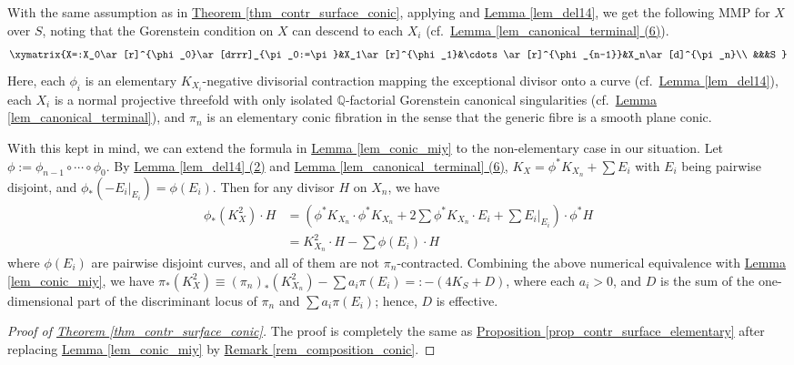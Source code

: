\begin{rmq}\label{rem_composition_conic}
With the same assumption as in {\hyperref[thm_contr_surface_conic]{Theorem    \ref*{thm_contr_surface_conic}}},  applying \cite[Proof of Proposition 3.4]{Rom19} and {\hyperref[lem_del14]{Lemma  \ref*{lem_del14}}}, we 
get the following MMP for $X$ over $S$, noting that the Gorenstein condition on $X$ can descend to each $X_i$ (cf.~{\hyperref[lem_canonical_terminal]{Lemma  \ref*{lem_canonical_terminal} (6)}}).
\[\xymatrix{X=:X_0\ar[r]^{\phi_0}\ar[drrr]_{\pi_0:=\pi}&X_1\ar[r]^{\phi_1}&\cdots\ar[r]^{\phi_{n-1}}&X_n\ar[d]^{\pi_n}\\
&&&S
}
\]
Here, each $\phi_i$ is an elementary $K_{X_i}$-negative divisorial contraction mapping the exceptional divisor  onto a curve (cf.~{\hyperref[lem_del14]{Lemma  \ref*{lem_del14}}}), each $X_i$ is a normal projective threefold with only isolated $\mathbb{Q}$-factorial Gorenstein canonical singularities  (cf.~{\hyperref[lem_canonical_terminal]{Lemma  \ref*{lem_canonical_terminal}}}), and $\pi_n$ is an elementary conic fibration in the sense that the generic fibre is a smooth plane conic. 

With this kept in mind, we can extend the formula in {\hyperref[lem_conic_miy]{Lemma   \ref*{lem_conic_miy}}} to the non-elementary case in our situation.
Let $\phi:=\phi_{n-1}\circ\cdots\circ\phi_0$.
By {\hyperref[lem_del14]{Lemma  \ref*{lem_del14} (2)}} and {\hyperref[lem_canonical_terminal]{Lemma  \ref*{lem_canonical_terminal} (6)}},  $K_X=\phi^*K_{X_n}+\sum E_i$ with $E_i$  being pairwise disjoint, and $\phi_*(-E_i|_{E_i})=\phi(E_i)$.
Then for any divisor $H$ on $X_n$, we have 
\begin{align*}
	\phi_*(K_X^2)\cdot H&=(\phi^*K_{X_n}\cdot\phi^*K_{X_n}+2\sum\phi^*K_{X_n}\cdot E_i+\sum E_i|_{E_i})\cdot \phi^*H\\
	&=K_{X_n}^2\cdot H-\sum \phi(E_i)\cdot H
\end{align*}
where $\phi(E_i)$ are pairwise disjoint  curves, and all of them are not $\pi_n$-contracted. 
Combining the above numerical equivalence with {\hyperref[lem_conic_miy]{Lemma    \ref*{lem_conic_miy}}}, we have 
$\pi_*(K_X^2)\equiv (\pi_n)_*(K_{X_n}^2)-\sum a_i\pi(E_i)=:-(4K_S+D)$,
where each $a_i>0$, and $D$ is the sum of the one-dimensional part of the discriminant locus of $\pi_n$ and $\sum a_i\pi(E_i)$; hence, $D$ is  effective.
\end{rmq}



\begin{proof}[Proof of {\hyperref[thm_contr_surface_conic]{Theorem    \ref*{thm_contr_surface_conic}}}]
The  proof is completely the same as {\hyperref[prop_contr_surface_elementary]{Proposition   \ref*{prop_contr_surface_elementary}}} after replacing {\hyperref[lem_conic_miy]{Lemma    \ref*{lem_conic_miy}}} by {\hyperref[rem_composition_conic]{Remark  \ref*{rem_composition_conic}}}.
\end{proof}


